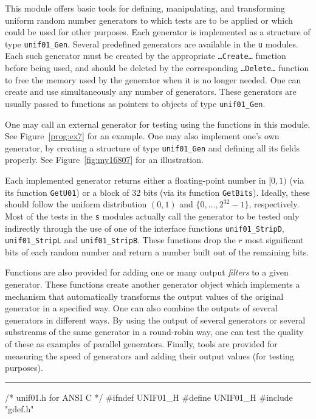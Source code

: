 
This module offers basic tools for defining, manipulating, and
transforming uniform random number generators to which tests are
to be applied or which could be used for other purposes.
Each generator is implemented as a
structure of type {\tt unif01\_Gen}.
Several predefined generators are available in the {\tt u} modules.
Each such generator must be created by the appropriate
{\tt \ldots Create\ldots} function before being used, and should
be deleted by the corresponding {\tt \ldots Delete\ldots} function
to free the memory used by the generator when it is no longer needed.
One can create and use simultaneously any number of generators.
These generators are usually passed to functions as pointers to
objects of type {\tt unif01\_Gen}.

One may call an external generator for testing using the functions in
this module. See Figure~\ref{prog:ex7} for an example.
One may also implement one's own generator, by creating a structure of
type {\tt unif01\_Gen} and defining all its fields properly.
See Figure~\ref{fig:my16807} for an illustration.

Each implemented generator returns either a floating-point
number in $[0, 1)$ (via its function {\tt GetU01})
or a block of 32 bits (via its function {\tt GetBits}).
Ideally, these should follow the uniform distribution $(0,1)$
and $\{0,\dots,2^{32}-1\}$, respectively.
Most of the tests in the {\tt s} modules actually call the generator
to be tested only indirectly through the use of one of the interface
functions {\tt unif01\_StripD},
 {\tt unif01\_StripL} and  {\tt unif01\_StripB}.
These functions drop the $r$ most significant bits of each random number
and return a number built out of the remaining bits.

Functions are also provided for adding one or many output {\em filters\/}
to a given generator. These functions create another generator
object which implements a mechanism that automatically
transforms the output values of the original generator in a specified way.
One can also combine the outputs of several generators in different ways.
By using the output of several generators or several substreams of the
same generator in a round-robin way, one can test the quality of these as
examples of parallel generators.
Finally, tools are provided for measuring the speed of generators
and adding their output values (for testing purposes).



\bigskip\hrule
\code\hide
/*  unif01.h  for ANSI C  */
#ifndef UNIF01_H
#define UNIF01_H
\endhide
#include "gdef.h"
\endcode


